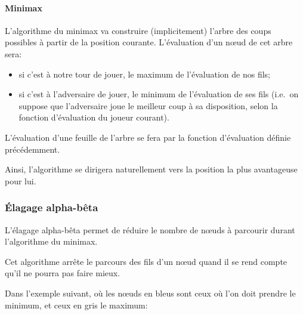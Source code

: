 \paragraph{Minimax}
L'algorithme du minimax va construire (implicitement) l'arbre des coups
possibles à partir de la position courante.
L'évaluation d'un nœud de cet arbre sera:
\begin{itemize}
  \item si c'est à notre tour de jouer, le maximum de l'évaluation de nos fils;
  \item si c'est à l'adversaire de jouer, le minimum de l'évaluation
    de ses fils (i.e.\ on suppose que l'adversaire joue le meilleur
    coup à sa disposition, selon la fonction d'évaluation du joueur courant).
\end{itemize}

L'évaluation d'une feuille de l'arbre se fera par la fonction
d'évaluation définie précédemment.

Ainsi, l'algorithme se dirigera naturellement vers la position la plus
avantageuse pour lui.

\subsubsection{Élagage alpha-bêta}
L'élagage alpha-bêta permet de réduire le nombre de nœuds à parcourir durant
l'algorithme du minimax.

Cet algorithme arrête le parcours des fils d'un nœud quand il se rend
compte qu'il ne pourra pas faire mieux.

Dans l'exemple suivant, où les nœuds en bleus sont ceux où l'on doit prendre
le minimum, et ceux en gris le maximum:

